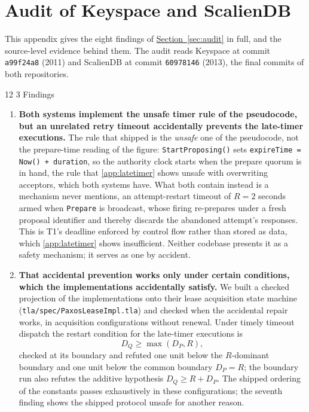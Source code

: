 \documentclass[final,5p,times,twocolumn,number]{elsarticle}
\makeatletter
\newcommand{\code}[1]{\texttt{#1}}
\newcommand{\secref}[1]{\hyperref[#1]{Section~\ref*{#1}}}
\renewcommand\subsection{\@startsection{subsection}{2}{\z@}%
           {12\p@ \@plus 6\p@ \@minus 3\p@}%
           {3\p@ \@plus 6\p@ \@minus 3\p@}%
           {\normalfont\normalsize\bfseries}}
\makeatother
\begin{document}
\section{Audit of Keyspace and ScalienDB}\label{app:audit}

This appendix gives the eight findings of \secref{sec:audit} in full, and the source-level evidence behind them.  The audit reads Keyspace at commit \code{a99f24a8} (2011) and ScalienDB at commit \code{60978146} (2013), the final commits of both repositories.

\subsection{Findings}

\begin{enumerate}\itemsep0.25em
\item \textbf{Both systems implement the unsafe timer rule of the pseudocode, but an unrelated retry timeout accidentally prevents the late-timer executions.}  The rule that shipped is the \emph{unsafe} one of the pseudocode, not the prepare-time reading of the figure: \code{StartProposing()} sets \code{expireTime = Now() + duration}, so the authority clock starts when the prepare quorum is in hand, the rule that \ref{app:latetimer} shows unsafe with overwriting acceptors, which both systems have.  What both contain instead is a mechanism \cite{ref1} never mentions, an attempt-restart timeout of $R = 2$ seconds armed when \code{Prepare} is broadcast, whose firing re-prepares under a fresh proposal identifier and thereby discards the abandoned attempt's responses.  This is T1's deadline enforced by control flow rather than stored as data, which \ref{app:latetimer} shows insufficient.  Neither codebase presents it as a safety mechanism; it serves as one by accident.
\item \textbf{That accidental prevention works only under certain conditions, which the implementations accidentally satisfy.}  We built a checked projection of the implementations onto their lease acquisition state machine (\code{tla/spec/PaxosLeaseImpl.tla}) and checked when the accidental repair works, in acquisition configurations without renewal.  Under timely timeout dispatch the restart condition for the late-timer executions is
\[
  D_Q \geq \max(D_P, R),
\]
checked at its boundary and refuted one unit below the $R$-dominant boundary and one unit below the common boundary $D_P = R$; the boundary run also refutes the additive hypothesis $D_Q \geq R + D_P$.  The shipped ordering of the constants passes exhaustively in these configurations; the seventh finding shows the shipped protocol unsafe for another reason.

\end{enumerate}
\end{document}
